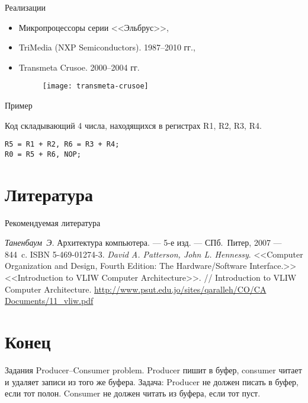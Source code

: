 \begin{frame}{Реализации}
\begin{itemize}
    \item Микропроцессоры серии <<Эльбрус>>,
    \item TriMedia (NXP Semiconductors). 1987--2010 гг.,
    \item Transmeta Crusoe. 2000--2004 гг.
    \begin{figure}[htbp]
        \texttt{[image: transmeta-crusoe]}
    \end{figure}
\end{itemize}
\end{frame}

\begin{frame}[fragile]{Пример}

Код складывающий 4 числа, находящихся в регистрах R1, R2, R3, R4.

\begin{lstlisting}
R5 = R1 + R2, R6 = R3 + R4;
R0 = R5 + R6, NOP;
\end{lstlisting}

\end{frame}

\section*{Литература}

\begin{frame}[allowframebreaks]{Рекомендуемая литература}
\begin{thebibliography}{99}
    \bibitem{} \textit{Таненбаум~Э.} Архитектура компьютера. --- 5-е изд. --- СПб.~Питер, 2007 --- 844~c. ISBN 5-469-01274-3.
     \textit{David A. Patterson, John L. Hennessy}. <<Computer Organization and Design, Fourth Edition: The Hardware/Software Interface.>>
     <<Introduction to VLIW Computer Architecture>>. // Introduction to VLIW Computer Architecture. \url{http://www.psut.edu.jo/sites/qaralleh/CO/CA Documents/11_vliw.pdf}
\end{thebibliography}
\end{frame}

\section*{Конец}

\ifsbertech
\begin{frame}{Задания}
Producer--Consumer problem.
\vfill
Producer пишит в буфер, consumer читает и удаляет записи из того же буфера.
\vfill
Задача: Producer не должен писать в буфер, если тот полон. Consumer не должен
читать из буфера, если тот пуст.
\end{frame}
\fi

